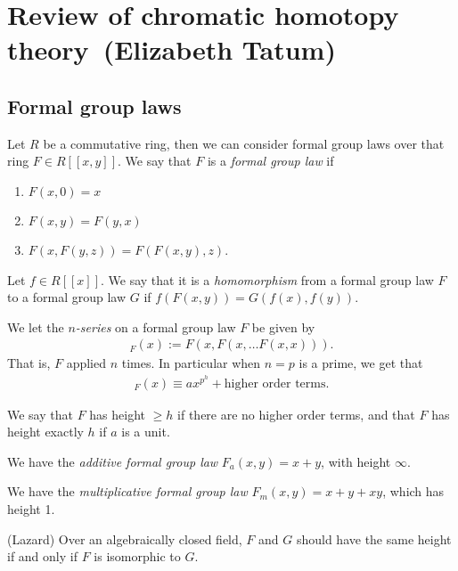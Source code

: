 \renewcommand{\thespeaker}{Elizabeth Tatum}
\renewcommand{\thetitle}{Review of chromatic homotopy theory}
\section{\thetitle~(\thespeaker)}

\subsection{Formal group laws}

Let $R$ be a commutative ring, then we can consider formal group laws over that ring $F \in R[[x,y]]$. We say that $F$ is a \textit{formal group law} if
\begin{enumerate}
    \item $F(x,0) = x$
    \item $F(x,y)= F(y,x)$
    \item $F(x,F(y,z)) = F(F(x,y),z)$.
\end{enumerate}
Let $f\in R[[x]]$. We say that it is a \textit{homomorphism} from a formal group law $F$ to a formal group law $G$ if $f(F(x,y)) = G(f(x),f(y))$.

We let the $n$\textit{-series} on a formal group law $F$ be given by
\begin{align*}
    [n]_F(x) := F(x,F(x, \ldots F(x,x))).
\end{align*}
That is, $F$ applied $n$ times. In particular when $n=p$ is a prime, we get that
\begin{align*}
    [p]_F(x) \equiv ax^{p^h} + \text{higher order terms}.
\end{align*}

We say that $F$ has height $\ge h$ if there are no higher order terms, and that $F$ has height exactly $h$ if $a$ is a unit.

\begin{example} We have the \textit{additive formal group law} $F_a(x,y) = x+y$, with height $\infty$.
\end{example}

\begin{example} We have the \textit{multiplicative formal group law} $F_m(x,y) = x+y+xy$, which has height 1.
\end{example}

\begin{theorem} (Lazard) Over an algebraically closed field, $F$ and $G$ should have the same height if and only if $F$ is isomorphic to $G$.
\end{theorem}


